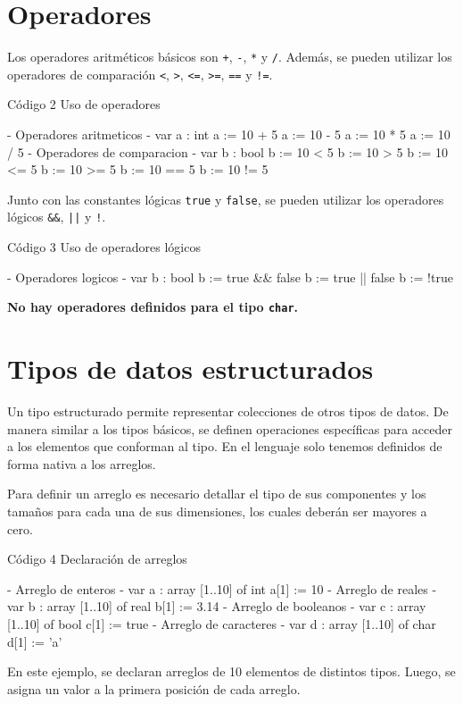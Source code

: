 \section{Operadores}
Los operadores aritméticos básicos son \texttt{+}, \texttt{-}, \texttt{*} y \texttt{/}. Además, se pueden utilizar los operadores de comparación \texttt{<}, \texttt{>}, \texttt{<=}, \texttt{>=}, \texttt{==} y \texttt{!=}.
\begin{codebox}{Código 2}
\footnotesize Uso de operadores
\tcblower
\begin{pascallike}
    {- Operadores aritmeticos -}
    var a : int
    a := 10 + 5
    a := 10 - 5
    a := 10 * 5
    a := 10 / 5
    {- Operadores de comparacion -}
    var b : bool
    b := 10 < 5
    b := 10 > 5
    b := 10 <= 5
    b := 10 >= 5
    b := 10 == 5
    b := 10 != 5
\end{pascallike}
\end{codebox}
Junto con las constantes lógicas \texttt{true} y \texttt{false}, se pueden utilizar los operadores lógicos \texttt{\&\&}, \texttt{||} y \texttt{!}.
\begin{codebox}{Código 3}
\footnotesize Uso de operadores lógicos
\tcblower
\begin{pascallike}
    {- Operadores logicos -}
    var b : bool
    b := true && false
    b := true || false
    b := !true
\end{pascallike}
\end{codebox}
\textbf{No hay operadores definidos para el tipo \texttt{char}.}

\section{Tipos de datos estructurados}
Un tipo estructurado permite representar colecciones de otros tipos de datos. De manera similar a los tipos básicos, se definen operaciones específicas para acceder a los elementos que conforman al tipo. En el lenguaje solo tenemos definidos de forma nativa a los arreglos.

Para definir un arreglo es necesario detallar el tipo de sus componentes y los tamaños para cada una de sus dimensiones, los cuales deberán ser mayores a cero.

\begin{codebox}{Código 4}
\footnotesize Declaración de arreglos
\tcblower
\begin{pascallike}
    {- Arreglo de enteros -}
    var a : array [1..10] of int
    a[1] := 10
    {- Arreglo de reales -}
    var b : array [1..10] of real
    b[1] := 3.14
    {- Arreglo de booleanos -}
    var c : array [1..10] of bool
    c[1] := true
    {- Arreglo de caracteres -}
    var d : array [1..10] of char
    d[1] := 'a'
\end{pascallike}
\end{codebox}
En este ejemplo, se declaran arreglos de 10 elementos de distintos tipos. Luego, se asigna un valor a la primera posición de cada arreglo.

